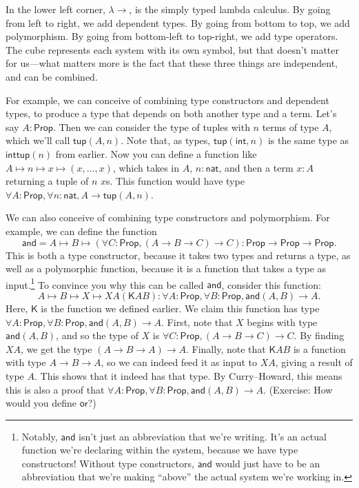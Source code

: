 \documentclass[11pt,paper=letter]{scrartcl}
\newcommand{\sf}{\mathsf}
\newcommand{\prop}{\mathsf{Prop}}
\begin{document}
In the lower left corner, $\lambda \to$, is the simply typed lambda calculus. By going from left to right, we add dependent types. By going from bottom to top, we add polymorphism. By going from bottom-left to top-right, we add type operators. The cube represents each system with its own symbol, but that doesn't matter for us---what matters more is the fact that these three things are independent, and can be combined.

For example, we can conceive of combining type constructors and dependent types, to produce a type that depends on both another type and a term. Let's say $A: \prop$. Then we can consider the type of tuples with $n$ terms of type $A$, which we'll call $\sf{tup}(A, n)$. Note that, as types, $\sf{tup}(\sf{int}, n)$ is the same type as $\sf{inttup}(n)$ from earlier. Now you can define a function like $A \mapsto n \mapsto x \mapsto (x, \ldots, x)$, which takes in $A$, $n : \sf{nat}$, and then a term $x : A$ returning a tuple of $n$ $x$s. This function would have type $\forall A: \prop, \forall n: \sf{nat}, A \to \sf{tup}(A, n)$.

We can also conceive of combining type constructors and polymorphism. For example, we can define the function \[
  \sf{and} = A \mapsto B \mapsto (\forall C: \prop, (A \to B \to C) \to C)
  : \prop \to \prop \to \prop.
\]
This is both a type constructor, because it takes two types and returns a type, as well as a polymorphic function, because it is a function that takes a type as input.\footnote{Notably, $\sf{and}$ isn't just an abbreviation that we're writing. It's an actual function we're declaring within the system, because we have type constructors! Without type constructors, $\sf{and}$ would just have to be an abbreviation that we're making ``above'' the actual system we're working in.} To convince you why this can be called $\sf{and}$, consider this function: \[
  A \mapsto B \mapsto X \mapsto XA(\sf{K}AB)
  : \forall A: \prop,
  \forall B: \prop,
  \sf{and}(A, B) \to A.
\]
Here, $\sf{K}$ is the function we defined earlier. We claim this function has type $\forall A: \prop, \forall B: \prop, \sf{and}(A, B) \to A$. First, note that $X$ begins with type $\sf{and}(A, B)$, and so the type of $X$ is $\forall C: \prop, (A \to B \to C) \to C$. By finding $XA$, we get the type $(A \to B \to A) \to A$. Finally, note that $\sf{K}AB$ is a function with type $A \to B \to A$, so we can indeed feed it as input to $XA$, giving a result of type $A$. This shows that it indeed has that type. By Curry--Howard, this means this is also a proof that $\forall A: \prop, \forall B: \prop, \sf{and}(A, B) \to A$. (Exercise: How would you define $\sf{or}$?)
\end{document}
